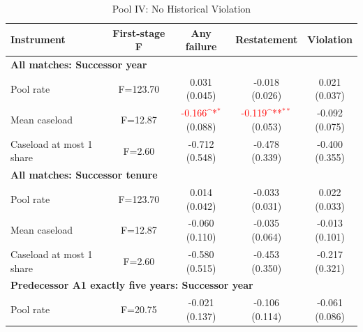 \begin{table}[htbp]
\footnotesize
\def\sym#1{\ifmmode^{#1}\else\(^{#1}\)\fi}
\centering
\caption{Pool IV: No Historical Violation}
\begin{threeparttable}
\begin{tabular}{p{}cccc}
\toprule
Instrument & First-stage F & Any failure & Restatement & Violation \\
\midrule
\multicolumn{5}{l}{\textbf{All matches: Successor year}} \\
Pool rate & F=123.70 & \shortstack{0.031\\(0.045)} & \shortstack{-0.018\\(0.026)} & \shortstack{0.021\\(0.037)} \\
Mean caseload & F=12.87 & \shortstack{\textcolor{red}{-0.166\sym{*}}\\(0.088)} & \shortstack{\textcolor{red}{-0.119\sym{**}}\\(0.053)} & \shortstack{-0.092\\(0.075)} \\
Caseload at most 1 share & F=2.60 & \shortstack{-0.712\\(0.548)} & \shortstack{-0.478\\(0.339)} & \shortstack{-0.400\\(0.355)} \\
\multicolumn{5}{l}{\textbf{All matches: Successor tenure}} \\
Pool rate & F=123.70 & \shortstack{0.014\\(0.042)} & \shortstack{-0.033\\(0.031)} & \shortstack{0.022\\(0.033)} \\
Mean caseload & F=12.87 & \shortstack{-0.060\\(0.110)} & \shortstack{-0.035\\(0.064)} & \shortstack{-0.013\\(0.101)} \\
Caseload at most 1 share & F=2.60 & \shortstack{-0.580\\(0.515)} & \shortstack{-0.453\\(0.350)} & \shortstack{-0.217\\(0.321)} \\
\multicolumn{5}{l}{\textbf{Predecessor A1 exactly five years: Successor year}} \\
Pool rate & F=20.75 & \shortstack{-0.021\\(0.137)} & \shortstack{-0.106\\(0.114)} & \shortstack{-0.061\\(0.086)} \\

\end{tabular}
\end{threeparttable}
\end{table}
